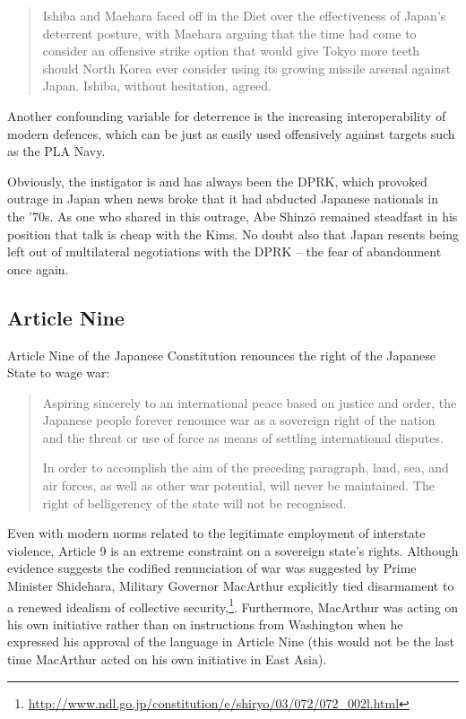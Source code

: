 \documentclass[letterpaper,12pt,twoside]{article} %
\begin{document}
\begin{multicols}{2}
\begin{quote}
    Ishiba and Maehara faced off in the Diet over the effectiveness of Japan’s deterrent posture, with Maehara arguing that the time had come to consider an offensive strike option that would give Tokyo more teeth should North Korea ever consider using its growing missile arsenal against Japan. Ishiba, without hesitation, agreed.\autocite[Chapter 3]{smith2019rearmed}
\end{quote}

Another confounding variable for deterrence is the increasing interoperability of modern defences, which can be just as easily used offensively against targets such as the PLA Navy.

Obviously, the instigator is and has always been the DPRK, which provoked outrage in Japan when news broke that it had abducted Japanese nationals in the '70s. As one who shared in this outrage, Abe Shinzō remained steadfast in his position that talk is cheap with the Kims. No doubt also that Japan resents being left out of multilateral negotiations with the DPRK -- the fear of abandonment once again.

\subsection{Article Nine}

Article Nine of the Japanese Constitution renounces the right of the Japanese State to wage war:

\begin{quote}
  Aspiring sincerely to an international peace based on justice and order, the Japanese people forever renounce war as a sovereign right of the nation and the threat or use of force as means of settling international disputes.

  In order to accomplish the aim of the preceding paragraph, land, sea, and air forces, as well as other war potential, will never be maintained. The right of belligerency of the state will not be recognised.
\end{quote}

Even with modern norms related to the legitimate employment of interstate violence, Article 9 is an extreme constraint on a sovereign state's rights. Although evidence suggests the codified renunciation of war was suggested by Prime Minister Shidehara, Military Governor MacArthur explicitly tied disarmament to a renewed idealism of collective security,\footnote{ \url{http://www.ndl.go.jp/constitution/e/shiryo/03/072/072_002l.html} }. Furthermore, MacArthur was acting on his own initiative rather than on instructions from Washington when he expressed his approval of the language in Article Nine (this would not be the last time MacArthur acted on his own initiative in East Asia).\autocite[45]{sissons1961pacifist}


\end{multicols}
\end{document}
